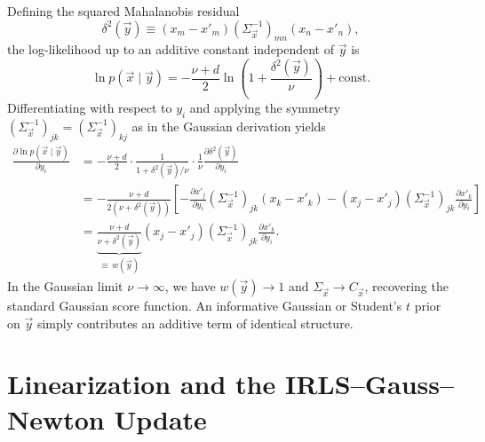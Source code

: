 \documentclass[11pt, a4paper]{article}
\begin{document}
Defining the squared Mahalanobis residual
\begin{equation}
\delta^2(\vec{y}) \equiv (x_m - x'_m) (\Sigma_{\vec{x}}^{-1})_{mn} (x_n - x'_n),
\end{equation}
the log-likelihood up to an additive constant independent of $\vec{y}$ is
\begin{equation}
\ln p(\vec{x} \mid \vec{y}) = -\frac{\nu + d}{2} \ln\!\left( 1 + \frac{\delta^2(\vec{y})}{\nu} \right) + \text{const}.
\end{equation}
Differentiating with respect to $y_i$ and applying the symmetry $(\Sigma_{\vec{x}}^{-1})_{jk} = (\Sigma_{\vec{x}}^{-1})_{kj}$ as in the Gaussian derivation yields
\begin{align}
\frac{\partial \ln p(\vec{x} \mid \vec{y})}{\partial y_i} &= -\frac{\nu + d}{2} \cdot \frac{1}{1 + \delta^2(\vec{y})/\nu} \cdot \frac{1}{\nu} \frac{\partial \delta^2(\vec{y})}{\partial y_i} \nonumber \\
&= -\frac{\nu + d}{2\left(\nu + \delta^2(\vec{y})\right)} \left[ -\frac{\partial x'_j}{\partial y_i} (\Sigma_{\vec{x}}^{-1})_{jk} (x_k - x'_k) - (x_j - x'_j) (\Sigma_{\vec{x}}^{-1})_{jk} \frac{\partial x'_k}{\partial y_i} \right] \nonumber \\
&= \underbrace{\frac{\nu + d}{\nu + \delta^2(\vec{y})}}_{\equiv\, w(\vec{y})} (x_j - x'_j) (\Sigma_{\vec{x}}^{-1})_{jk} \frac{\partial x'_k}{\partial y_i}.
\end{align}
In the Gaussian limit $\nu \to \infty$, we have $w(\vec{y}) \to 1$ and $\Sigma_{\vec{x}} \to C_{\vec{x}}$, recovering the standard Gaussian score function. An informative Gaussian or Student's $t$ prior on $\vec{y}$ simply contributes an additive term of identical structure.

\section{Linearization and the IRLS--Gauss--Newton Update}
\end{document}
